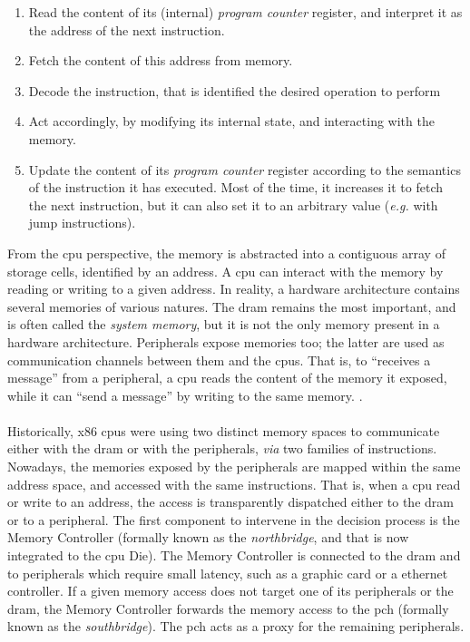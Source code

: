 \begin{enumerate}
\item Read the content of its (internal) \emph{program counter} register, and
  interpret it as the address of the next instruction.
%
\item Fetch the content of this address from memory.
%
\item Decode the instruction, that is identified the desired operation to
  perform
%
\item Act accordingly, by modifying its internal state, and interacting with the
  memory.
%
\item Update the content of its \emph{program counter} register according to the
  semantics of the instruction it has executed. Most of the time, it increases
  it to fetch the next instruction, but it can also set it to an arbitrary value
  (\emph{e.g.} with jump instructions).
\end{enumerate}

From the \ac{cpu} perspective, the memory is abstracted into a contiguous array
of storage cells, identified by an address.
%
A \ac{cpu} can interact with the memory by reading or writing to a given
address.
%
In reality, a hardware architecture contains several memories of various
natures.
%
The \ac{dram} remains the most important, and is often called the \emph{system
  memory}, but it is not the only memory present in a hardware architecture.
%
Peripherals expose memories too; the latter are used as communication channels
between them and the \acp{cpu}.
%
That is, to ``receives a message'' from a peripheral, a \ac{cpu} reads the
content of the memory it exposed, while it can ``send a message'' by writing to
the same memory.
%
.

\paragraph{}
%
Historically, x86 \acp{cpu} were using two distinct memory spaces to communicate
either with the \ac{dram} or with the peripherals, \emph{via} two families of
instructions. 
%
Nowadays, the memories exposed by the peripherals are mapped within the same
address space, and accessed with the same instructions.
%
That is, when a \ac{cpu} read or write to an address, the access is
transparently dispatched either to the \ac{dram} or to a peripheral.
%
The first component to intervene in the decision process is the Memory
Controller (formally known as the \emph{northbridge}, and that is now integrated
to the \ac{cpu} Die).
%
The Memory Controller is connected to the \ac{dram} and to peripherals which
require small latency, such as a graphic card or a ethernet controller.
%
%
If a given memory access does not target one of its peripherals or the
\ac{dram}, the Memory Controller forwards the memory access to the \ac{pch}
(formally known as the \emph{southbridge}).
%
The \ac{pch} acts as a proxy for the remaining peripherals.

